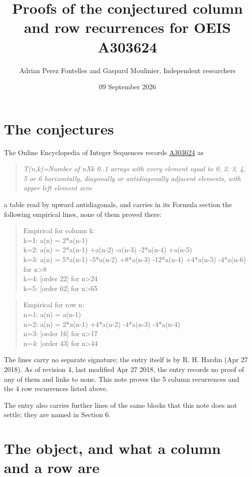 \documentclass[11pt]{article}
\title{Proofs of the conjectured column and row recurrences for OEIS A303624}
\author{Adrian Perez Fontelles and Gaspard Moulinier, Independent researchers}
\date{09 September 2026}
\theoremstyle{definition}
\begin{document}
\maketitle
\section{The conjectures}

The Online Encyclopedia of Integer Sequences records \href{https://oeis.org/A303624}{A303624} as

\begin{quote}\itshape T(n,k)=Number of nXk 0..1 arrays with every element equal to 0, 2, 3, 4, 5 or 6 horizontally, diagonally or antidiagonally adjacent elements, with upper left element zero\end{quote}

a table read by upward antidiagonals, and carries in its Formula section the following empirical lines, none of them proved there:

\begin{quote}\ttfamily Empirical for column k:\\
k=1: a(n) = 2*a(n-1)\\k=2: a(n) = 2*a(n-1) +a(n-2) -a(n-3) -2*a(n-4) +a(n-5)\\k=3: a(n) = 5*a(n-1) -5*a(n-2) +8*a(n-3) -12*a(n-4) +4*a(n-5) -4*a(n-6) for n>8\\k=4: [order 22] for n>24\\k=5: [order 62] for n>65\end{quote}

\begin{quote}\ttfamily Empirical for row n:\\
n=1: a(n) = a(n-1)\\n=2: a(n) = 2*a(n-1) +4*a(n-2) -4*a(n-3) -4*a(n-4)\\n=3: [order 16] for n>17\\n=4: [order 43] for n>44\end{quote}

The lines carry no separate signature; the entry itself is by R. H. Hardin (Apr 27 2018). As of revision 4, last modified Apr 27 2018, the entry records no proof of any of them and links to none. This note proves the 5 column recurrences and the 4 row recurrences listed above.

The entry also carries further lines of the same blocks that this note does not settle; they are named in Section 6.

\section{The object, and what a column and a row are}
\end{document}
